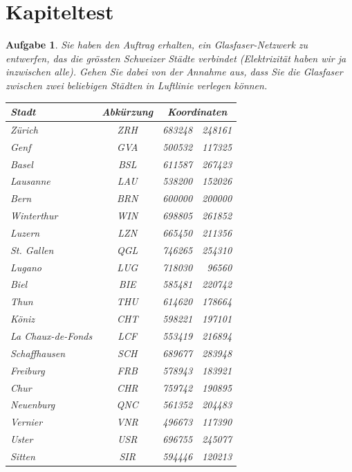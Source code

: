\documentclass[12pt,a4paper]{report}
\theoremstyle{break}
\newtheorem{exercise}{Aufgabe}[section]
\theoremstyle{plain}
\begin{document}

\pagebreak
\section{Kapiteltest}

\begin{exercise}
Sie haben den Auftrag erhalten, ein Glasfaser-Netzwerk zu entwerfen,
das die gr\"{o}ssten Schweizer St\"{a}dte verbindet
(Elektrizit\"{a}t haben wir ja inzwischen alle). Gehen Sie dabei von
der Annahme aus, dass Sie die Glasfaser zwischen zwei beliebigen St\"{a}dten in
Luftlinie verlegen k\"{o}nnen.\\

\begin{tabular}{|l|c|r@{ / }r|}\hline
  Stadt & Abk\"{u}rzung & \multicolumn{2}{c|}{Koordinaten} \\
  \hline
  Z\"{u}rich & ZRH & 683248 & 248161 \\
  Genf &         GVA & 500532 & 117325 \\
  Basel &        BSL & 611587 & 267423 \\
  Lausanne & LAU & 538200 & 152026 \\
  Bern &         BRN & 600000 & 200000 \\
  Winterthur & WIN & 698805 & 261852 \\
  Luzern &     LZN & 665450 &  211356 \\
  St. Gallen & QGL & 746265 & 254310 \\
  Lugano &    LUG & 718030 & 96560 \\
  Biel &          BIE  & 585481 & 220742 \\
  \hline
  Thun &       THU & 614620 & 178664 \\
  K\"{o}niz & CHT & 598221 & 197101 \\
  La Chaux-de-Fonds & LCF & 553419 & 216894 \\
  Schaffhausen & SCH & 689677 & 283948 \\
  Freiburg & FRB & 578943 & 183921 \\
  Chur & CHR & 759742 & 190895 \\
  Neuenburg & QNC & 561352 & 204483 \\
  Vernier & VNR & 496673 & 117390 \\
  Uster & USR & 696755 & 245077 \\
  Sitten & SIR & 594446 & 120213 \\
  \hline
\end{tabular}\\


\end{exercise}
\end{document}
